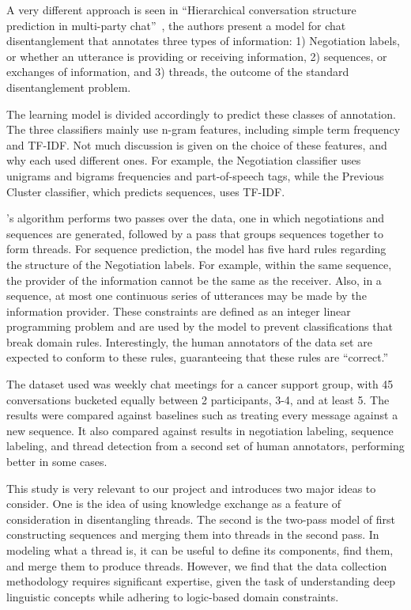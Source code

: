 \documentclass[11pt]{article}
\newcommand{\titlecite}[2]{``#1''~\cite{#2}}
\begin{document}
A very different approach is seen in \titlecite{Hierarchical conversation
structure prediction in multi-party chat}{Mayfield2012a}, the authors present
a model for chat disentanglement that annotates three types of information: 1) 
Negotiation labels, or whether an utterance is providing or receiving 
information, 2) sequences, or exchanges of information, and 3) threads, the 
outcome of the standard disentanglement problem.

The learning model is divided accordingly to predict these classes of
annotation. The three classifiers mainly use n-gram features, including simple
term frequency and TF-IDF. Not much discussion is given on the choice of these
features, and why each used different ones. For example, the Negotiation
classifier uses unigrams and bigrams frequencies and part-of-speech tags, while
the Previous Cluster classifier, which predicts sequences, uses TF-IDF. 

\cite{Mayfield2012a}'s algorithm performs two passes over the data, 
one in which negotiations and sequences are generated, followed by a pass
that groups sequences together to form threads. For sequence prediction, 
the model has five hard rules regarding the
structure of the Negotiation labels. For example, within the same sequence, the
provider of the information cannot be the same as the receiver. Also, in a
sequence, at most one continuous series of utterances may be made by the
information provider. These constraints are defined as an integer linear
programming problem and are used by the model to prevent classifications that
break domain rules. Interestingly, the human annotators of the data set are
expected to conform to these rules, guaranteeing that these rules are
“correct.”

The dataset used was weekly chat meetings for a cancer support group, with 45
conversations bucketed equally between 2 participants, 3-4, and at least 5. The
results were compared against baselines such as treating every message against
a new sequence. It also compared against results in negotiation labeling,
sequence labeling, and thread detection from a second set of human annotators,
performing better in some cases.

This study is very relevant to our project and introduces two major ideas to
consider. One is the idea of using knowledge exchange as a feature of
consideration in disentangling threads. The second is the two-pass model of
first constructing sequences and merging them into threads in the second pass.
In modeling what a thread is, it can be useful to define its components,
find them, and merge them to produce threads. However, we find that the
data collection methodology requires significant expertise, given the task of
understanding deep linguistic concepts while adhering to logic-based domain
constraints.
\end{document}
